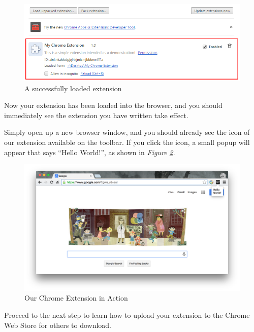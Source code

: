 \documentclass[11pt]{article}
\begin{document}
\begin{enumerate}
	\begin{figure}[htb]
	\centering
	\vspace*{-1em}
	\includegraphics[width=.9\textwidth]{figures/loadedext.png}
	\caption{A successfully loaded extension\label{fig:loadedext}}
	\vspace*{-1em}
	\end{figure}
\end{enumerate}

\newpage
Now your extension has been loaded into the browser, and you should immediately see the extension you have written take effect.

Simply open up a new browser window, and you should already see the icon of our extension available on the toolbar. If you click the icon, a small popup will appear that says ``Hello World!'', as shown in \emph{Figure \ref{fig:ext}}.

	\begin{figure}[htb]
	\centering
	\vspace*{-1em}
	\includegraphics[width=1\textwidth]{figures/ext.png}
	\vspace*{-1em}
	\caption{Our Chrome Extension in Action\label{fig:ext}}
	\end{figure}

Proceed to the next step to learn how to upload your extension to the Chrome Web Store for others to download.
\end{document}
